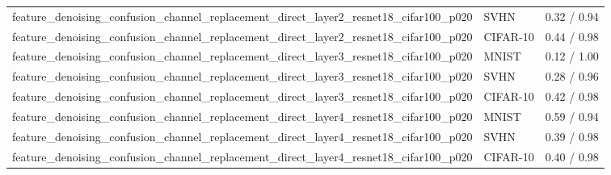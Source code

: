 \begin{tabular}{lll}
feature\_denoising\_confusion\_channel\_replacement\_direct\_layer2\_resnet18\_cifar100\_p020 & SVHN & 0.32 / 0.94 \\
feature\_denoising\_confusion\_channel\_replacement\_direct\_layer2\_resnet18\_cifar100\_p020 & CIFAR-10 & 0.44 / 0.98 \\
feature\_denoising\_confusion\_channel\_replacement\_direct\_layer3\_resnet18\_cifar100\_p020 & MNIST & 0.12 / 1.00 \\
feature\_denoising\_confusion\_channel\_replacement\_direct\_layer3\_resnet18\_cifar100\_p020 & SVHN & 0.28 / 0.96 \\
feature\_denoising\_confusion\_channel\_replacement\_direct\_layer3\_resnet18\_cifar100\_p020 & CIFAR-10 & 0.42 / 0.98 \\
feature\_denoising\_confusion\_channel\_replacement\_direct\_layer4\_resnet18\_cifar100\_p020 & MNIST & 0.59 / 0.94 \\
feature\_denoising\_confusion\_channel\_replacement\_direct\_layer4\_resnet18\_cifar100\_p020 & SVHN & 0.39 / 0.98 \\
feature\_denoising\_confusion\_channel\_replacement\_direct\_layer4\_resnet18\_cifar100\_p020 & CIFAR-10 & 0.40 / 0.98 \\
\bottomrule
\end{tabular}
